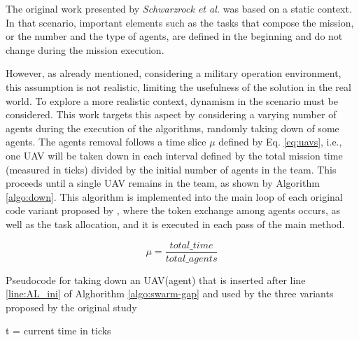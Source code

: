 
The original work presented by \textit{Schwarzrock et al.}\cite{MAS07} was based on a static context. In that scenario, important elements such as the tasks that compose the mission, or the number and the type of agents, are defined in the beginning and do not change during the mission execution.

However, as already mentioned, considering a military operation environment, this assumption is not realistic, limiting the usefulness of the solution in the real world. To explore a more realistic context, dynamism in the scenario must be considered. This work targets this aspect by considering a varying number of agents during the execution of the algorithms, randomly taking down of some agents. 
The agents removal follows a time slice $\mu$ defined by Eq. \ref{eq:uavs}, i.e., one UAV will be taken down in each interval defined by the total mission time (measured in ticks) divided by the initial number of agents in the team. This proceeds until a single UAV remains in the team, as shown by Algorithm \ref{algo:down}. This algorithm is implemented into the main loop of each original code variant proposed by \cite{MAS07}, where the token exchange among agents occurs, as well as the task allocation, and it is executed in each pass of the main method.

\begin{equation} \label{eq:uavs}
	\mu = \frac{total\_time}{total\_agents}
\end{equation}

\begin{algorithm}[!ht]
	\caption{Pseudocode for taking down an UAV(agent) that is inserted after line \ref{line:AL_ini} of Alghorithm \ref{algo:swarm-gap} and used by the three variants proposed by the original study \cite{MAS07}}
	\label{algo:down}
	
	\SetAlgoLined
	\DontPrintSemicolon
	\SetNlSkip{0.3em}
	
	t = current time in ticks \;
	
\end{algorithm}


